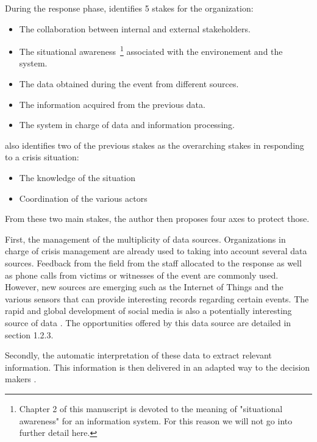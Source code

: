 During the response phase, \textcite[.~12--18]{fertierInterpretationAutomatiqueDonnees2018} identifies 5 stakes for the organization:

\begin{itemize}
    \item The collaboration between internal and external stakeholders.
    \item The situational awareness~\footnote{Chapter 2 of this manuscript is devoted to the meaning of "situational awareness" for an information system. For this reason we will not go into further detail here.} associated with the environement and the system.
    \item The data obtained during the event from different sources.
    \item The information acquired from the previous data.
    \item The system in charge of data and information processing.
\end{itemize}

\textcite{batardIntegrerContributionsCitoyennes2021} also identifies two of the previous stakes as the overarching stakes in responding to a crisis situation:

\begin{itemize}
    \item The knowledge of the situation
    \item Coordination of the various actors
\end{itemize}

From these two main stakes, the author then proposes four axes to protect those.

First, the management of the multiplicity of data sources.
Organizations in charge of crisis management are already used to taking into account several data sources.
Feedback from the field from the staff allocated to the response as well as phone calls from victims or witnesses of the event are commonly used.
However, new sources are emerging such as the Internet of Things and the various sensors that can provide interesting records regarding certain events.
The rapid and global development of social media is also a potentially interesting source of data \textcite{meierStrengtheningHumanitarianInformation2013}.
The opportunities offered by this data source are detailed in section 1.2.3.

Secondly, the automatic interpretation of these data to extract relevant information.
This information is then delivered in an adapted way to the decision makers \textcite{luokkalaDevelopingInformationSystems2014,vandewalleImprovingSituationAwareness2016}.

